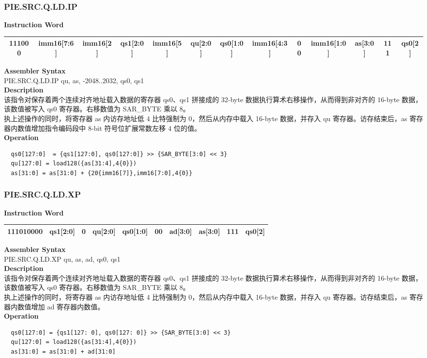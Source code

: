 \newpage
\subsubsection{PIE.SRC.Q.LD.IP}\label{instruction:PIESRCQLDIP}
\setlength\tabcolsep{3.5pt}
\textbf{Instruction Word} \\
\begin{tabular}{|c|c|c|c|c|c|c|c|c|c|c|c|c|}
	\hline
	111000 & imm16[7:6] & imm16[2] & qs1[2:0] & imm16[5] & qu[2:0] & qs0[1:0] & imm16[4:3] & 00 & imm16[1:0] & as[3:0] & 111 & qs0[2] \\
	\hline
\end{tabular}

\textbf{Assembler Syntax} \\
PIE.SRC.Q.LD.IP qu, as, -2048..2032, qs0, qs1 \\
\textbf{Description} \\
该指令对保存着两个连续对齐地址载入数据的寄存器 qs0、qs1 拼接成的 32-byte 数据执行算术右移操作，从而得到非对齐的 16-byte 数据，该数值被写入 qs0 寄存器。右移数值为 SAR\_BYTE 乘以 8。\\
执上述操作的同时，将寄存器 as 内访存地址低 4 比特强制为 0，然后从内存中载入 16-byte 数据，并存入 qu 寄存器。访存结束后，as 寄存器内数值增加指令编码段中 8-bit 符号位扩展常数左移 4 位的值。\\
\textbf{Operation}
\begin{lstlisting}
  qs0[127:0]  = {qs1[127:0], qs0[127:0]} >> {SAR_BYTE[3:0] << 3}
  qu[127:0] = load128({as[31:4],4{0}})
  as[31:0] = as[31:0] + {20{imm16[7]},imm16[7:0],4{0}}
\end{lstlisting}

\newpage
\subsubsection{PIE.SRC.Q.LD.XP}\label{instruction:PIESRCQLDXP}
\setlength\tabcolsep{6pt}
\textbf{Instruction Word} \\
\begin{tabular}{|c|c|c|c|c|c|c|c|c|c|}
	\hline
	111010000 & qs1[2:0] & 0 & qu[2:0] & qs0[1:0] & 00 & ad[3:0] & as[3:0] & 111 & qs0[2] \\
	\hline
\end{tabular}

\textbf{Assembler Syntax} \\
PIE.SRC.Q.LD.XP qu, as, ad, qs0, qs1 \\
\textbf{Description} \\
该指令对保存着两个连续对齐地址载入数据的寄存器 qs0、qs1 拼接成的 32-byte 数据执行算术右移操作，从而得到非对齐的 16-byte 数据，该数值被写入 qs0 寄存器。右移数值为 SAR\_BYTE 乘以 8。\\
执上述操作的同时，将寄存器 as 内访存地址低 4 比特强制为 0，然后从内存中载入 16-byte 数据，并存入 qu 寄存器。访存结束后，as 寄存器内数值增加 ad 寄存器内数值。\\
\textbf{Operation}
\begin{lstlisting}
  qs0[127:0] = {qs1[127: 0], qs0[127: 0]} >> {SAR_BYTE[3:0] << 3}
  qu[127:0] = load128({as[31:4],4{0}})
  as[31:0] = as[31:0] + ad[31:0]
\end{lstlisting}

